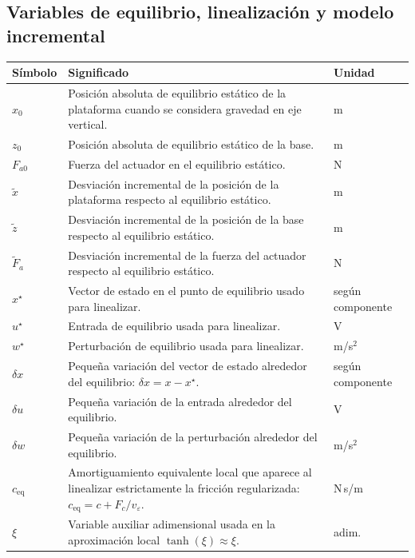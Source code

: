\documentclass[11pt]{article}
\begin{document}
\subsection{Variables de equilibrio, linealizaci\'on y modelo incremental}

\begin{center}
\small
\begin{tabular}{>{\raggedright\arraybackslash}p{3.0cm} >{\raggedright\arraybackslash}p{9.0cm} >{\raggedright\arraybackslash}p{2.2cm}}
\toprule
\textbf{S\'imbolo} & \textbf{Significado} & \textbf{Unidad} \\
\midrule
$x_0$ & Posici\'on absoluta de equilibrio est\'atico de la plataforma cuando se considera gravedad en eje vertical. & m \\
$z_0$ & Posici\'on absoluta de equilibrio est\'atico de la base. & m \\
$F_{a0}$ & Fuerza del actuador en el equilibrio est\'atico. & N \\
$\tilde x$ & Desviaci\'on incremental de la posici\'on de la plataforma respecto al equilibrio est\'atico. & m \\
$\tilde z$ & Desviaci\'on incremental de la posici\'on de la base respecto al equilibrio est\'atico. & m \\
$\tilde F_a$ & Desviaci\'on incremental de la fuerza del actuador respecto al equilibrio est\'atico. & N \\
$x^\star$ & Vector de estado en el punto de equilibrio usado para linealizar. & seg\'un componente \\
$u^\star$ & Entrada de equilibrio usada para linealizar. & V \\
$w^\star$ & Perturbaci\'on de equilibrio usada para linealizar. & m/s$^2$ \\
$\delta x$ & Peque\~na variaci\'on del vector de estado alrededor del equilibrio: $\delta x=x-x^\star$. & seg\'un componente \\
$\delta u$ & Peque\~na variaci\'on de la entrada alrededor del equilibrio. & V \\
$\delta w$ & Peque\~na variaci\'on de la perturbaci\'on alrededor del equilibrio. & m/s$^2$ \\
$c_{\text{eq}}$ & Amortiguamiento equivalente local que aparece al linealizar estrictamente la fricci\'on regularizada: $c_{\text{eq}}=c+F_c/v_\varepsilon$. & N\,s/m \\
$\xi$ & Variable auxiliar adimensional usada en la aproximaci\'on local $\tanh(\xi)\approx \xi$. & adim. \\
\bottomrule
\end{tabular}
\end{center}
\end{document}

